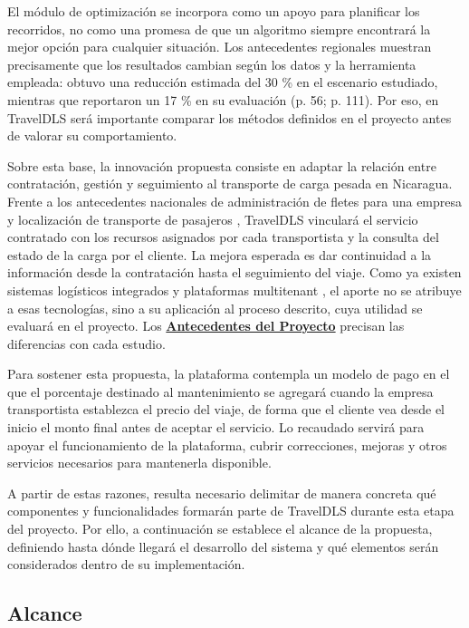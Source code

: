 El módulo de optimización se incorpora como un apoyo para planificar los recorridos, no como una promesa de que un algoritmo siempre encontrará la mejor opción para cualquier situación. Los antecedentes regionales muestran precisamente que los resultados cambian según los datos y la herramienta empleada: \textcite{aguilar2022optimizacion} obtuvo una reducción estimada del 30 \% en el escenario estudiado, mientras que \textcite{hernandez2024evaluacion} reportaron un 17 \% en su evaluación (p. 56; p. 111). Por eso, en TravelDLS será importante comparar los métodos definidos en el proyecto antes de valorar su comportamiento.

Sobre esta base, la innovación propuesta consiste en adaptar la relación entre contratación, gestión y seguimiento al transporte de carga pesada en Nicaragua. Frente a los antecedentes nacionales de administración de fletes para una empresa y localización de transporte de pasajeros \parencite{aragon2018implementacion,garcia2022desarrollo}, TravelDLS vinculará el servicio contratado con los recursos asignados por cada transportista y la consulta del estado de la carga por el cliente. La mejora esperada es dar continuidad a la información desde la contratación hasta el seguimiento del viaje. Como ya existen sistemas logísticos integrados y plataformas multitenant \parencite{sultan2022real,lasluisa2026diseno}, el aporte no se atribuye a esas tecnologías, sino a su aplicación al proceso descrito, cuya utilidad se evaluará en el proyecto. Los \textbf{\hyperref[sec:antecedentes-proyecto]{Antecedentes del Proyecto}} precisan las diferencias con cada estudio.

Para sostener esta propuesta, la plataforma contempla un modelo de pago en el que el porcentaje destinado al mantenimiento se agregará cuando la empresa transportista establezca el precio del viaje, de forma que el cliente vea desde el inicio el monto final antes de aceptar el servicio. Lo recaudado servirá para apoyar el funcionamiento de la plataforma, cubrir correcciones, mejoras y otros servicios necesarios para mantenerla disponible.

A partir de estas razones, resulta necesario delimitar de manera concreta qué componentes y funcionalidades formarán parte de TravelDLS durante esta etapa del proyecto. Por ello, a continuación se establece el alcance de la propuesta, definiendo hasta dónde llegará el desarrollo del sistema y qué elementos serán considerados dentro de su implementación.

\subsection{Alcance}
\label{sec:alcance}

